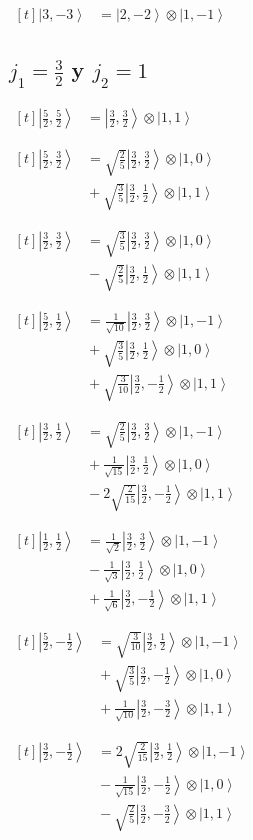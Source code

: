 \documentclass[11pt,a4paper]{article}
\newcommand{\estadocelda}[1]{%
  \begin{minipage}[t]{0.48\linewidth}
  \small\raggedright
  \(\displaystyle\begin{aligned}[t]#1\end{aligned}\)
  \end{minipage}%
}
\newcommand{\ket}[1]{\left|#1\right\rangle}
\begin{document}
\noindent\estadocelda{
\ket{3,-3} &= \ket{2,-2}\otimes\ket{1,-1}
}\par\addvspace{1.4em}

\subsection{\texorpdfstring{$j_1=\frac{3}{2}$ y $j_2=1$}{j1=3/2 y j2=1}}

\noindent\estadocelda{
\ket{\frac{5}{2},\frac{5}{2}} &= \ket{\frac{3}{2},\frac{3}{2}}\otimes\ket{1,1}
}\hfill\estadocelda{
\ket{\frac{5}{2},\frac{3}{2}} &= \sqrt{\frac{2}{5}}\ket{\frac{3}{2},\frac{3}{2}}\otimes\ket{1,0} \\
 &{}+\sqrt{\frac{3}{5}}\ket{\frac{3}{2},\frac{1}{2}}\otimes\ket{1,1}
}\par\addvspace{1.4em}

\noindent\estadocelda{
\ket{\frac{3}{2},\frac{3}{2}} &= \sqrt{\frac{3}{5}}\ket{\frac{3}{2},\frac{3}{2}}\otimes\ket{1,0} \\
 &{}-\sqrt{\frac{2}{5}}\ket{\frac{3}{2},\frac{1}{2}}\otimes\ket{1,1}
}\hfill\estadocelda{
\ket{\frac{5}{2},\frac{1}{2}} &= \frac{1}{\sqrt{10}}\ket{\frac{3}{2},\frac{3}{2}}\otimes\ket{1,-1} \\
 &{}+\sqrt{\frac{3}{5}}\ket{\frac{3}{2},\frac{1}{2}}\otimes\ket{1,0} \\
 &{}+\sqrt{\frac{3}{10}}\ket{\frac{3}{2},-\frac{1}{2}}\otimes\ket{1,1}
}\par\addvspace{1.4em}

\noindent\estadocelda{
\ket{\frac{3}{2},\frac{1}{2}} &= \sqrt{\frac{2}{5}}\ket{\frac{3}{2},\frac{3}{2}}\otimes\ket{1,-1} \\
 &{}+\frac{1}{\sqrt{15}}\ket{\frac{3}{2},\frac{1}{2}}\otimes\ket{1,0} \\
 &{}-2\sqrt{\frac{2}{15}}\ket{\frac{3}{2},-\frac{1}{2}}\otimes\ket{1,1}
}\hfill\estadocelda{
\ket{\frac{1}{2},\frac{1}{2}} &= \frac{1}{\sqrt{2}}\ket{\frac{3}{2},\frac{3}{2}}\otimes\ket{1,-1} \\
 &{}-\frac{1}{\sqrt{3}}\ket{\frac{3}{2},\frac{1}{2}}\otimes\ket{1,0} \\
 &{}+\frac{1}{\sqrt{6}}\ket{\frac{3}{2},-\frac{1}{2}}\otimes\ket{1,1}
}\par\addvspace{1.4em}

\noindent\estadocelda{
\ket{\frac{5}{2},-\frac{1}{2}} &= \sqrt{\frac{3}{10}}\ket{\frac{3}{2},\frac{1}{2}}\otimes\ket{1,-1} \\
 &{}+\sqrt{\frac{3}{5}}\ket{\frac{3}{2},-\frac{1}{2}}\otimes\ket{1,0} \\
 &{}+\frac{1}{\sqrt{10}}\ket{\frac{3}{2},-\frac{3}{2}}\otimes\ket{1,1}
}\hfill\estadocelda{
\ket{\frac{3}{2},-\frac{1}{2}} &= 2\sqrt{\frac{2}{15}}\ket{\frac{3}{2},\frac{1}{2}}\otimes\ket{1,-1} \\
 &{}-\frac{1}{\sqrt{15}}\ket{\frac{3}{2},-\frac{1}{2}}\otimes\ket{1,0} \\
 &{}-\sqrt{\frac{2}{5}}\ket{\frac{3}{2},-\frac{3}{2}}\otimes\ket{1,1}
}\par\addvspace{1.4em}
\end{document}
